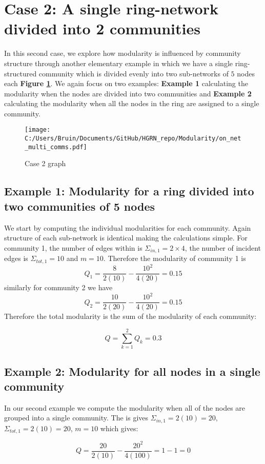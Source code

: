 \documentclass[a4paper,12pt]{article}
\begin{document}
	\section{Case 2: A single ring-network divided into 2 communities}
	In this second case, we explore how modularity is influenced by community structure through another elementary example in which we have a single ring-structured community which is divided evenly into two sub-networks of $5$ nodes each \textbf{\textbf{Figure \ref{fig:case2}}}. We again focus on two examples: \textbf{Example 1} calculating the modularity when the nodes are divided into two communities and \textbf{Example 2} calculating the modularity when all the nodes in the ring are assigned to a single community. 
	\begin{figure}[H]
		\centering
		\caption{Case 2 graph}
		\texttt{[image: C:/Users/Bruin/Documents/GitHub/HGRN\_repo/Modularity/on\_net\_multi\_comms.pdf]}
		\label{fig:case2}
	\end{figure}
	
	
	\subsection{Example 1: Modularity for a ring divided into two communities of 5 nodes}
		We start by computing the individual modularities for each community. Again structure of each sub-network is identical making the calculations simple. For community 1, the number of edges within is $\Sigma_{in,1} = 2\times4$, the number of incident edges is $\Sigma_{tot,1} = 10$ and $m = 10$. Therefore the modularity of community 1 is 
		\[Q_1 = \frac{8}{2(10)} - \frac{10^2}{4(20)} = 0.15\]
		similarly for community 2 we have 
		\[Q_2 = \frac{10}{2(20)} - \frac{10^2}{4(20)} = 0.15\]
		Therefore the total modularity is the sum of the modularity of each community:
	
	\[ Q = \sum_{k=1}^2 Q_k = 0.3\]
	\newpage
	\subsection{Example 2: Modularity for all nodes in a single community}
		In our second example we compute the modularity when all of the nodes are grouped into a single community. The is gives $\Sigma_{in,1} = 2(10) = 20$, $\Sigma_{tot,1} = 2(10) = 20$,  $m = 10$ which gives:
	
		\[ Q = \frac{20}{2(10)}-\frac{20^2}{4(100)} = 1-1 = 0 \]
	
	
	
\end{document}
